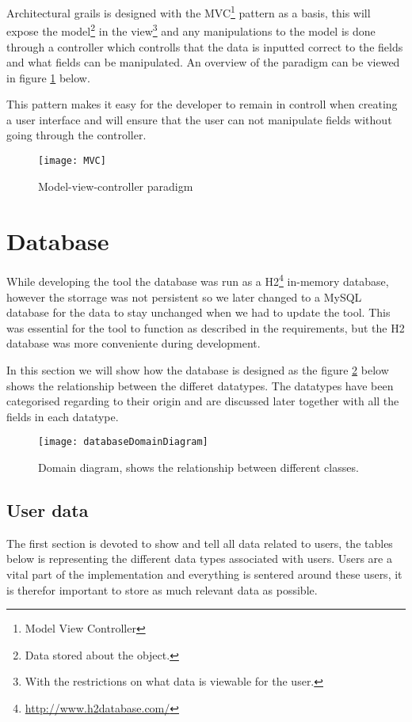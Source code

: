 Architectural grails is designed with the MVC\footnote{Model View Controller} pattern as a basis, this will expose the model\footnote{Data stored about the object.} in the view\footnote{With the restrictions on what data is viewable for the user.} and any manipulations to the model is done through a controller which controlls that the data is inputted correct to the fields and what fields can be manipulated. An overview of the paradigm can be viewed in figure \ref{mvc-paradigm} below.

This pattern makes it easy for the developer to remain in controll when creating a user interface and will ensure that the user can not manipulate fields without going through the controller.

\begin{figure}[H]
    \centering
        \texttt{[image: MVC]}
    \caption{Model-view-controller paradigm}
    \label{mvc-paradigm}
\end{figure}

\section{Database}
While developing the tool the database was run as a H2\footnote{\url{http://www.h2database.com/}} in-memory database, however the storrage was not persistent so we later changed to a MySQL database for the data to stay unchanged when we had to update the tool. This was essential for the tool to function as described in the requirements, but the H2 database was more conveniente during development.

In this section we will show how the database is designed as the figure \ref{databaseDomainDiagram} below shows the relationship between the differet datatypes. The datatypes have been categorised regarding to their origin and are discussed later together with all the fields in each datatype.

\begin{figure}[H]
\centering
	\texttt{[image: databaseDomainDiagram]}
\caption{Domain diagram, shows the relationship between different classes.}
\label{databaseDomainDiagram}
\end{figure}

\subsection{User data}
The first section is devoted to show and tell all data related to users, the tables below is representing the different data types associated with users. Users are a vital part of the implementation and everything is sentered around these users, it is therefor important to store as much relevant data as possible. \\

